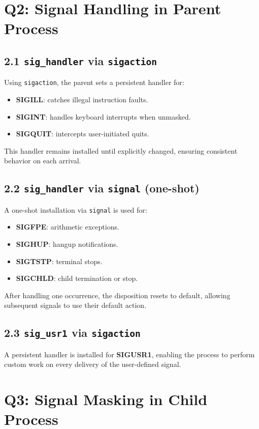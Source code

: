 \documentclass[12pt]{article}
\begin{document}
	\section*{Q2: Signal Handling in Parent Process}
	\subsection*{2.1 \texttt{sig\_handler} via \texttt{sigaction}}
	Using \texttt{sigaction}, the parent sets a persistent handler for:
	\begin{itemize}
		\item \textbf{SIGILL}: catches illegal instruction faults.
		\item \textbf{SIGINT}: handles keyboard interrupts when unmasked.
		\item \textbf{SIGQUIT}: intercepts user-initiated quits.
	\end{itemize}
	This handler remains installed until explicitly changed, ensuring consistent behavior on each arrival.
	
	\subsection*{2.2 \texttt{sig\_handler} via \texttt{signal} (one-shot)}
	A one-shot installation via \texttt{signal} is used for:
	\begin{itemize}
		\item \textbf{SIGFPE}: arithmetic exceptions.
		\item \textbf{SIGHUP}: hangup notifications.
		\item \textbf{SIGTSTP}: terminal stops.
		\item \textbf{SIGCHLD}: child termination or stop.
	\end{itemize}
	After handling one occurrence, the disposition resets to default, allowing subsequent signals to use their default action.
	
	\subsection*{2.3 \texttt{sig\_usr1} via \texttt{sigaction}}
	A persistent handler is installed for \textbf{SIGUSR1}, enabling the process to perform custom work on every delivery of the user-defined signal.
	
	\section*{Q3: Signal Masking in Child Process}
\end{document}
